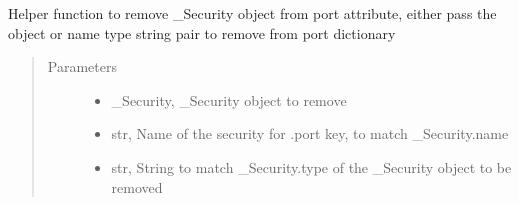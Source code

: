 \documentclass[letterpaper,10pt,english]{sphinxmanual}
\begin{document}
\begin{fulllineitems}
\begin{fulllineitems}
\begin{quote}
\begin{description}
\end{description}\end{quote}

\end{fulllineitems}


\begin{fulllineitems}
\label{\detokenize{securities:risk_dash.securities.Portfolio.remove_security}}
\sphinxAtStartPar
Helper function to remove \_Security object from port attribute, either pass the object or name type string pair to remove from port dictionary
\begin{quote}\begin{description}
\item[{Parameters}] \leavevmode\begin{itemize}
\item {} 
\sphinxAtStartPar
{} \textendash{} \_Security, \_Security object to remove

\item {} 
\sphinxAtStartPar
{} \textendash{} str, Name of the security for .port key, to match \_Security.name

\item {} 
\sphinxAtStartPar
{} \textendash{} str, String to match \_Security.type of the \_Security object to be removed

\end{itemize}

\end{description}\end{quote}

\end{fulllineitems}



\end{fulllineitems}
\end{document}
